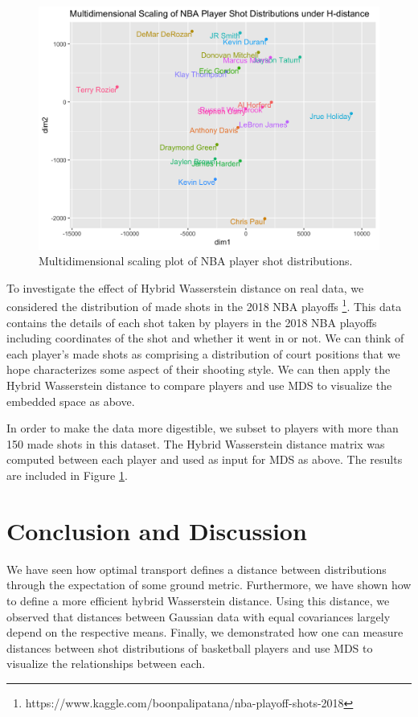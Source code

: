 \documentclass[11pt, a4paper, fleqn]{article}
\numberwithin{equation}{section}
\numberwithin{figure}{section}
\numberwithin{table}{section}
\begin{document}
\begin{figure}[t]
\centering
\includegraphics[width=\linewidth]{NBAMDSPlot}
\caption{Multidimensional scaling plot of NBA player shot distributions.}
\label{fig:nba}
\end{figure}


To investigate the effect of Hybrid Wasserstein distance on real data, we considered the distribution of made shots in the 2018 NBA playoffs \footnote{https://www.kaggle.com/boonpalipatana/nba-playoff-shots-2018}. This data contains the details of each shot taken by players in the 2018 NBA playoffs including coordinates of the shot and whether it went in or not. We can think of each player's made shots as comprising a distribution of court positions that we hope characterizes some aspect of their shooting style. We can then apply the Hybrid Wasserstein distance to compare players and use MDS to visualize the embedded space as above.

In order to make the data more digestible, we subset to players with more than 150 made shots in this dataset. The Hybrid Wasserstein distance matrix was computed between each player and used as input for MDS as above. The results are included in Figure \ref{fig:nba}. 

\section{Conclusion and Discussion}\label{sec:discussion}
We have seen how optimal transport defines a distance between distributions through the expectation of some ground metric. Furthermore, we have shown how to define a more efficient hybrid Wasserstein distance. Using this distance, we observed that distances between Gaussian data with equal covariances largely depend on the respective means. Finally, we demonstrated how one can measure distances between shot distributions of basketball players and use MDS to visualize the relationships between each.
\end{document}
